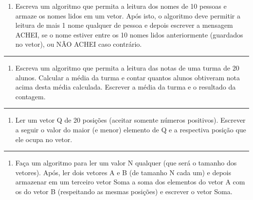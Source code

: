 \documentclass[12pt,a4paper]{article}
\renewcommand{\linethickness}{0.05em}
\providecommand{\tightlist}{%
      \setlength{\itemsep}{0pt}\setlength{\parskip}{0pt}}
\begin{document}
\begin{enumerate}
\def\labelenumi{\arabic{enumi}.}
\setcounter{enumi}{4}
\tightlist
\item
  Escreva um algoritmo que permita a leitura dos nomes de 10 pessoas e
  armaze os nomes lidos em um vetor. Após isto, o algoritmo deve
  permitir a leitura de mais 1 nome qualquer de pessoa e depois escrever
  a mensagem ACHEI, se o nome estiver entre os 10 nomes lidos
  anteriormente (guardados no vetor), ou NÃO ACHEI caso contrário.
\end{enumerate}

    \begin{center}\rule{0.5\linewidth}{\linethickness}\end{center}

\begin{enumerate}
\def\labelenumi{\arabic{enumi}.}
\setcounter{enumi}{5}
\tightlist
\item
  Escreva um algoritmo que permita a leitura das notas de uma turma de
  20 alunos. Calcular a média da turma e contar quantos alunos obtiveram
  nota acima desta média calculada. Escrever a média da turma e o
  resultado da contagem.
\end{enumerate}

    \begin{center}\rule{0.5\linewidth}{\linethickness}\end{center}

\begin{enumerate}
\def\labelenumi{\arabic{enumi}.}
\setcounter{enumi}{6}
\tightlist
\item
  Ler um vetor Q de 20 posições (aceitar somente números positivos).
  Escrever a seguir o valor do maior (e menor) elemento de Q e a
  respectiva posição que ele ocupa no vetor.
\end{enumerate}

    \begin{center}\rule{0.5\linewidth}{\linethickness}\end{center}

\begin{enumerate}
\def\labelenumi{\arabic{enumi}.}
\setcounter{enumi}{7}
\tightlist
\item
  Faça um algoritmo para ler um valor N qualquer (que será o tamanho dos
  vetores). Após, ler dois vetores A e B (de tamanho N cada um) e depois
  armazenar em um terceiro vetor Soma a soma dos elementos do vetor A
  com os do vetor B (respeitando as mesmas posições) e escrever o vetor
  Soma.
\end{enumerate}
\end{document}
